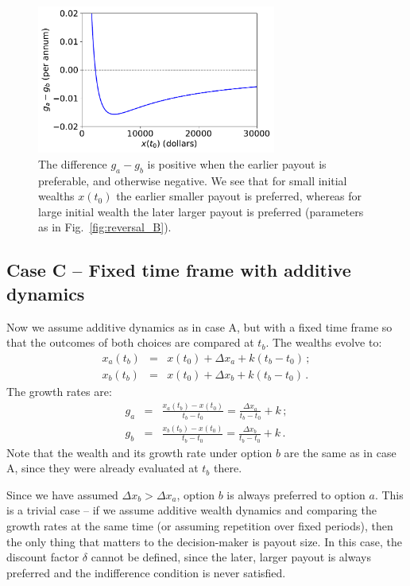 \documentclass[11pt]{article}
\newcommand{\flabel}[1]{\label{fig:#1}}
\newcommand{\fref}[1]{Fig.~\ref{fig:#1}}
\newcommand{\bea}{\begin{eqnarray}}
\newcommand{\eea}{\end{eqnarray}}
\newcommand{\Dx}{\Delta x}
\numberwithin{equation}{section}
\begin{document}
\begin{figure}[!htb]
\centering
\includegraphics[width=0.7\textwidth]{./figures/ga_gb.pdf}
\caption{The difference $g_a-g_b$ is positive when the earlier payout is preferable, and otherwise negative. We see that for small initial wealths $x(t_0)$ the earlier smaller payout is preferred, whereas for large initial wealth the later larger payout is preferred (parameters as in \fref{reversal_B}).}
\flabel{reversal_B2}
\end{figure}

\FloatBarrier
\subsection{Case C -- Fixed time frame with additive dynamics}\label{sec:case_C}

Now we assume additive dynamics as in case A, but with a fixed time frame so that the outcomes of both choices are compared at $t_b$. The wealths evolve to: \bea
x_a\left(t_b\right) &=& x\left(t_0\right) + \Dx_a + k(t_b-t_0)\,; \\
x_b\left(t_b\right) &=& x\left(t_0\right) + \Dx_b + k(t_b-t_0)\,.
\eea
The growth rates are:
\bea
g_a &=& \frac{x_a\left(t_b\right) - x\left(t_0\right)}{t_b-t_0} = \frac{\Dx_a}{t_b-t_0} + k\,;\\
g_b &=& \frac{x_b\left(t_b\right) - x\left(t_0\right)}{t_b-t_0} = \frac{\Dx_b}{t_b-t_0} + k\,.
\eea
Note that the wealth and its growth rate under option $b$ are the same as in case A, since they were already evaluated at $t_b$ there.

Since we have assumed $\Dx_b > \Dx_a$, option $b$ is always preferred to option $a$. This is a trivial case -- if we assume additive wealth dynamics and comparing the growth rates at the same time (or assuming repetition over fixed periods), then the only thing that matters to the decision-maker is payout size. In this case, the discount factor $\delta$ cannot be defined, since the later, larger payout is always preferred and the indifference condition is never satisfied.
\end{document}
